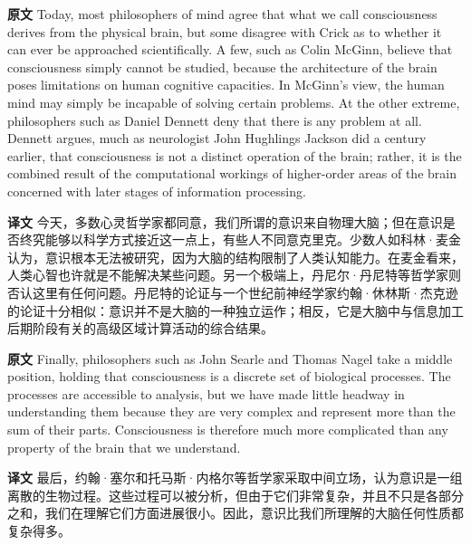 \documentclass[UTF8,zihao=-4]{ctexart}
\newcommand{\BodyFont}{\fontsize{10.5pt}{15.5pt}\selectfont}
\newcommand{\origlabel}{\textbf{原文}\quad}
\newcommand{\translabel}{\textbf{译文}\quad}
\newenvironment{enblock}{\par\noindent\begingroup\BodyFont\origlabel}{\par\endgroup}
\newenvironment{zhblock}{\par\noindent\begingroup\BodyFont\translabel}{\par\endgroup\vspace{0.35em}}
\begin{document}
\begin{enblock}
Today, most philosophers of mind agree that what we call consciousness derives from the physical brain, but some disagree with Crick as to whether it can ever be approached scientifically. A few, such as Colin McGinn, believe that consciousness simply cannot be studied, because the architecture of the brain poses limitations on human cognitive capacities. In McGinn's view, the human mind may simply be incapable of solving certain problems. At the other extreme, philosophers such as Daniel Dennett deny that there is any problem at all. Dennett argues, much as neurologist John Hughlings Jackson did a century earlier, that consciousness is not a distinct operation of the brain; rather, it is the combined result of the computational workings of higher-order areas of the brain concerned with later stages of information processing.
\end{enblock}
\begin{zhblock}
今天，多数心灵哲学家都同意，我们所谓的意识来自物理大脑；但在意识是否终究能够以科学方式接近这一点上，有些人不同意克里克。少数人如科林·麦金认为，意识根本无法被研究，因为大脑的结构限制了人类认知能力。在麦金看来，人类心智也许就是不能解决某些问题。另一个极端上，丹尼尔·丹尼特等哲学家则否认这里有任何问题。丹尼特的论证与一个世纪前神经学家约翰·休林斯·杰克逊的论证十分相似：意识并不是大脑的一种独立运作；相反，它是大脑中与信息加工后期阶段有关的高级区域计算活动的综合结果。\end{zhblock}

\begin{enblock}
Finally, philosophers such as John Searle and Thomas Nagel take a middle position, holding that consciousness is a discrete set of biological processes. The processes are accessible to analysis, but we have made little headway in understanding them because they are very complex and represent more than the sum of their parts. Consciousness is therefore much more complicated than any property of the brain that we understand.
\end{enblock}
\begin{zhblock}
最后，约翰·塞尔和托马斯·内格尔等哲学家采取中间立场，认为意识是一组离散的生物过程。这些过程可以被分析，但由于它们非常复杂，并且不只是各部分之和，我们在理解它们方面进展很小。因此，意识比我们所理解的大脑任何性质都复杂得多。\end{zhblock}
\end{document}

